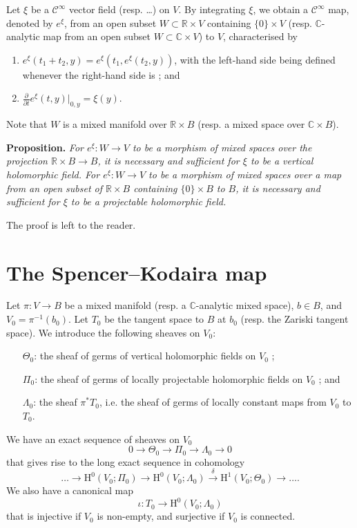 \documentclass{article}
\newenvironment{itenv}[1]
  {\phantomsection\par\medskip\noindent\textbf{#1.}\itshape}
  {\medskip}
\newcommand{\RR}{\mathbb{R}}
\newcommand{\CC}{\mathbb{C}}
\newcommand{\HH}{\mathrm{H}}
\newcommand{\oldpage}[1]{\marginpar{\footnotesize$\Big\vert$ \textit{p.~#1}}}
\begin{document}
\oldpage{2-06}
Let $\xi$ be a $\mathscr{C}^\infty$ vector field (resp. \ldots) on $V$.
By integrating $\xi$, we obtain a $\mathscr{C}^\infty$ map, denoted by $e^\xi$, from an open subset $W\subset\RR\times V$ containing $\{0\}\times V$ (resp. $\CC$-analytic map from an open subset $W\subset\CC\times V$) to $V$, characterised by
\begin{enumerate}[(1)]
  \item $e^\xi(t_1+t_2,y) = e^\xi(t_1,e^\xi(t_2,y))$, with the left-hand side being defined whenever the right-hand side is ; and
  \item $\frac{\partial}{\partial t}e^\xi(t,y)|_{0,y} = \xi(y)$.
\end{enumerate}
Note that $W$ is a mixed manifold over $\RR\times B$ (resp. a mixed space over $\CC\times B$).

\begin{itenv}{Proposition}
  For $e^\xi\colon W\to V$ to be a morphism of mixed spaces over the projection $\RR\times B\to B$, it is necessary and sufficient for $\xi$ to be a vertical holomorphic field.
  For $e^\xi\colon W\to V$ to be a morphism of mixed spaces over a map from an open subset of $\RR\times B$ containing $\{0\}\times B$ to $B$, it is necessary and sufficient for $\xi$ to be a projectable holomorphic field.
\end{itenv}

The proof is left to the reader.


\section{The Spencer--Kodaira map}
\label{IV}

Let $\pi\colon V\to B$ be a mixed manifold (resp. a $\CC$-analytic mixed space), $b\in B$, and $V_0=\pi^{-1}(b_0)$.
Let $T_0$ be the tangent space to $B$ at $b_0$ (resp. the Zariski tangent space).
We introduce the following sheaves on $V_0$:
\begin{itemize}
  \item[$\Theta_0$:] the sheaf of germs of vertical holomorphic fields on $V_0$ ;
  \item[$\Pi_0$:] the sheaf of germs of locally projectable holomorphic fields on $V_0$ ; and
  \item[$\Lambda_0$:] the sheaf $\pi^*T_0$, i.e. the sheaf of germs of locally constant maps from $V_0$ to $T_0$.
\end{itemize}

We have an exact sequence of sheaves on $V_0$
\[
  0 \to \Theta_0 \to \Pi_0 \to \Lambda_0 \to 0
\]
that gives rise to the long exact sequence in cohomology
\[
  \ldots \to \HH^0(V_0;\Pi_0) \to \HH^0(V_0;\Lambda_0) \xrightarrow{\delta} \HH^1(V_0;\Theta_0) \to \ldots.
\]
We also have a canonical map
\oldpage{2-07}
\[
  \iota\colon T_0 \to \HH^0(V_0;\Lambda_0)
\]
that is injective if $V_0$ is non-empty, and surjective if $V_0$ is connected.
\end{document}
